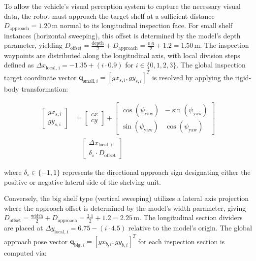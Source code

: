 To allow the vehicle's visual perception system to capture the necessary visual data, the robot must approach the target shelf at a sufficient distance $D_{\text{approach}} = 1.20\,\text{m}$ normal to its longitudinal inspection face. For small shelf instances (horizontal sweeping), this offset is determined by the model's depth parameter, yielding $D_{\text{offset}} = \frac{\text{depth}}{2} + D_{\text{approach}} = \frac{0.6}{2} + 1.2 = 1.50\,\text{m}$. The inspection waypoints are distributed along the longitudinal axis, with local division steps defined as $\Delta x_{\text{local, i}} = -1.35 + (i \cdot 0.9)$ for $i \in \{0, 1, 2, 3\}$. The global inspection target coordinate vector $\mathbf{q}_{\text{small}, i} = [gx_{s, i}, gy_{s, i}]^T$ is resolved by applying the rigid-body transformation:

\begin{equation}
\begin{aligned}
\begin{bmatrix} gx_{s, i} \\ gy_{s, i} \end{bmatrix} &= \begin{bmatrix} cx \\ cy \end{bmatrix} + \begin{bmatrix} \cos(\psi_{\text{yaw}}) & -\sin(\psi_{\text{yaw}}) \\ \sin(\psi_{\text{yaw}}) & \cos(\psi_{\text{yaw}}) \end{bmatrix} \\
&\quad \begin{bmatrix} \Delta x_{\text{local, i}} \\ \delta_s \cdot D_{\text{offset}} \end{bmatrix}
\end{aligned}
\label{eq:small_shelf_approach_pose}
\end{equation}

where $\delta_s \in \{-1, 1\}$ represents the directional approach sign designating either the positive or negative lateral side of the shelving unit.

Conversely, the big shelf type (vertical sweeping) utilizes a lateral axis projection where the approach offset is determined by the model's width parameter, giving $D_{\text{offset}} = \frac{\text{width}}{2} + D_{\text{approach}} = \frac{2.1}{2} + 1.2 = 2.25\,\text{m}$. The longitudinal section dividers are placed at $\Delta y_{\text{local, i}} = 6.75 - (i \cdot 4.5)$ relative to the model's origin. The global approach pose vector $\mathbf{q}_{\text{big}, i} = [gx_{b, i}, gy_{b, i}]^T$ for each inspection section is computed via:

